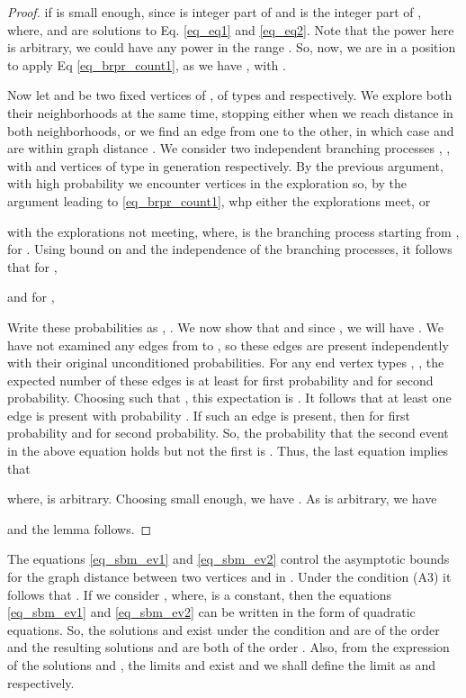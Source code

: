 \documentclass[graybox]{svmult}
\begin{document}
\begin{proof}
if  is small enough, since  is integer part of  and  is the integer part of , where,  and  are solutions to Eq. \eqref{eq_eq1} and \eqref{eq_eq2}. Note that the power  here is arbitrary, we could have any power in the range . 
So, now, we are in a position to apply Eq \eqref{eq_brpr_count1}, as we have , with .

Now let  and  be two fixed vertices of , of types  and  respectively. We explore both their neighborhoods at the same time, stopping either when we reach distance  in both neighborhoods, or we find an edge from one to the other, in which case  and  are within graph distance . We consider two independent branching processes , , with  and  vertices of type  in generation  respectively. By the previous argument, with high probability we encounter  vertices in the exploration so, by the argument leading to \eqref{eq_brpr_count1}, whp either the explorations meet, or 

with the explorations not meeting, where,  is the branching process starting from , for . Using bound on  and the independence of the branching processes, it follows that for , 

and for ,

Write these probabilities as , . We now show that  and since , we will have .
We have not examined any edges from  to , so these edges are present independently with their original unconditioned probabilities. 
For any end vertex types , , the expected number of these edges is at least  for first probability and  for second probability. Choosing  such that , this expectation is . It follows that at least one edge is present with probability . If such an edge is present, then  for first probability and  for second probability. So, the probability that the second event in the above equation holds but not the first is . Thus, the last equation implies that

where,  is arbitrary. Choosing  small enough, we have . As  is arbitrary, we
have

and the lemma follows.
\end{proof}

The equations \eqref{eq_sbm_ev1} and \eqref{eq_sbm_ev2} control the asymptotic bounds for the graph distance  between two vertices  and  in . Under the condition (A3) it follows that . If we consider , where,  is a constant, then the equations \eqref{eq_sbm_ev1} and \eqref{eq_sbm_ev2} can be written in the form of quadratic equations. So, the solutions  and  exist under the condition  and  are of the order  and the resulting solutions  and  are both of the order . Also, from the expression of the solutions  and , the limits  and  exist and we shall define the limit as  and  respectively.  
\end{document}
